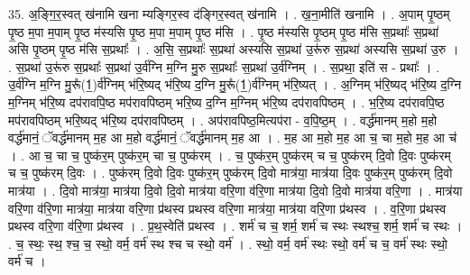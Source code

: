 \documentclass[17pt]{extarticle}
\begin{document}
35. अ॒ङ्गि॒र॒स्वत् ख॑नामि खना म्यङ्गिर॒स्व द॑ङ्गिर॒स्वत् ख॑नामि । . ख॒ना॒मीति॑ खनामि । . अ॒पाम् पृ॒ष्ठम् पृ॒ष्ठ म॒पा म॒पाम् पृ॒ष्ठ म॑स्यसि पृ॒ष्ठ म॒पा म॒पाम् पृ॒ष्ठ म॑सि । . पृ॒ष्ठ म॑स्यसि पृ॒ष्ठम् पृ॒ष्ठ म॑सि स॒प्रथाः᳚ स॒प्रथा॑ असि पृ॒ष्ठम् पृ॒ष्ठ म॑सि स॒प्रथाः᳚ । . अ॒सि॒ स॒प्रथाः᳚ स॒प्रथा॑ अस्यसि स॒प्रथा॑ उ॒रू॑रु स॒प्रथा॑ अस्यसि स॒प्रथा॑ उ॒रु । . स॒प्रथा॑ उ॒रू॑रु स॒प्रथाः᳚ स॒प्रथा॑ उ॒र्व॑ग्नि म॒ग्नि मु॒रु स॒प्रथाः᳚ स॒प्रथा॑ उ॒र्व॑ग्निम् । . स॒प्रथा॒ इति॑ स - प्रथाः᳚ । . उ॒र्व॑ग्नि म॒ग्नि मु॒रू᳚(1॒)र्व॑ग्निम् भ॑रि॒ष्यद् भ॑रि॒ष्य द॒ग्नि मु॒रू᳚(1॒)र्व॑ग्निम् भ॑रि॒ष्यत् । . अ॒ग्निम् भ॑रि॒ष्यद् भ॑रि॒ष्य द॒ग्नि म॒ग्निम् भ॑रि॒ष्य दप॑रावपि॒ष्ठ मप॑रावपिष्ठम् भरि॒ष्य द॒ग्नि म॒ग्निम् भ॑रि॒ष्य दप॑रावपिष्ठम् । . भ॒रि॒ष्य दप॑रावपि॒ष्ठ मप॑रावपिष्ठम् भरि॒ष्यद् भ॑रि॒ष्य दप॑रावपिष्ठम् । . अप॑रावपिष्ठ॒मित्यप॑रा - व॒पि॒ष्ठ॒म् । . वर्द्ध॑मानम् म॒हो म॒हो वर्द्ध॑मानं॒ ॅवर्द्ध॑मानम् म॒ह आ म॒हो वर्द्ध॑मानं॒ ॅवर्द्ध॑मानम् म॒ह आ । . म॒ह आ म॒हो म॒ह आ च॒ चा म॒हो म॒ह आ च॑ । . आ च॒ चा च॒ पुष्क॑र॒म् पुष्क॑र॒म् चा च॒ पुष्क॑रम् । . च॒ पुष्क॑र॒म् पुष्क॑रम् च च॒ पुष्क॑रम् दि॒वो दि॒वः पुष्क॑रम् च च॒ पुष्क॑रम् दि॒वः । . पुष्क॑रम् दि॒वो दि॒वः पुष्क॑र॒म् पुष्क॑रम् दि॒वो मात्र॑या॒ मात्र॑या दि॒वः पुष्क॑र॒म् पुष्क॑रम् दि॒वो मात्र॑या । . दि॒वो मात्र॑या॒ मात्र॑या दि॒वो दि॒वो मात्र॑या वरि॒णा व॑रि॒णा मात्र॑या दि॒वो दि॒वो मात्र॑या वरि॒णा । . मात्र॑या वरि॒णा व॑रि॒णा मात्र॑या॒ मात्र॑या वरि॒णा प्र॑थस्व प्रथस्व वरि॒णा मात्र॑या॒ मात्र॑या वरि॒णा प्र॑थस्व । . व॒रि॒णा प्र॑थस्व प्रथस्व वरि॒णा व॑रि॒णा प्र॑थस्व । . प्र॒थ॒स्वेति॑ प्रथस्व । . शर्म॑ च च॒ शर्म॒ शर्म॑ च स्थः स्थश्च॒ शर्म॒ शर्म॑ च स्थः । . च॒ स्थः॒ स्थ॒ श्च॒ च॒ स्थो॒ वर्म॒ वर्म॑ स्थ श्च च स्थो॒ वर्म॑ । . स्थो॒ वर्म॒ वर्म॑ स्थः स्थो॒ वर्म॑ च च॒ वर्म॑ स्थः स्थो॒ वर्म॑ च । \newline
\pagebreak
{}
\end{document}

